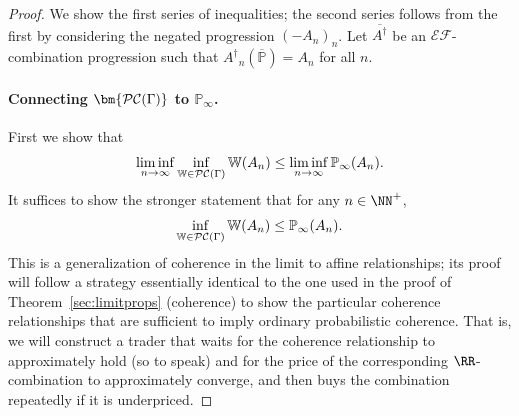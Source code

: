 \documentclass[authordate,onecolumn,noenvironments]{miri-tech-article}
\numberwithin{equation}{subsection}
\newcommand{\seq}[1]{{\overline{#1}}}
\newcommand{\nn}{n}
\newcommand{\exfeatures}{\mathcal{E\!F}} %
\newcommand{\aff}{A}
\newcommand{\gens}{\dagger}
\newcommand{\gen}[1]{{#1^\gens}}
\newcommand{\BelState}{\mathbb{P}}
\newcommand{\pt}{\BelState}
\newcommand{\MP}{\seq{\pt}}
\newcommand{\cworlds}{\mathcal{P\-C}} %
\newcommand{\World}{\mathbb{W}}
\newcommand{\Theory}{\Gamma}
\begin{document}
\begin{proof}

  We show the first series of inequalities; the second series follows from the first by considering the negated progression $(-\aff_n)_n$. Let $\seq{\gen\aff}$ be an $\exfeatures$-combination progression such that $\gen\aff_n(\MP) = \aff_n$ for all $n$.



\paragraph{Connecting $\bm{\cworlds(\Theory)}$ to $\bm{\pt_\infty}$.}

First we show that 
%
\[ \liminf_{n \to \infty} \inf_{\World\in \cworlds(\Theory)} \World(\aff_{\nn}) \le \liminf_{n \to \infty}  \pt_{\infty}(\aff_{n}). \]
%
It suffices to show the stronger statement that for any $n\in\NN^+$, 
%
\[ \inf_{\World\in\cworlds(\Theory)} \World(\aff_{\nn}) \le \pt_{\infty}(\aff_{n}). \]
%
 This is a generalization 
of coherence in the limit to affine relationships; its proof will follow a strategy essentially identical to the one used in the proof of Theorem~\ref{sec:limitprops} (coherence)
to show the particular coherence relationships that are sufficient to imply ordinary probabilistic coherence. That is,
we will construct a trader that waits for the coherence relationship to approximately hold (so to speak) and for the price of the corresponding $\RR$-combination to
approximately converge, and then buys the combination repeatedly if it is underpriced. 


\end{proof}
\end{document}
